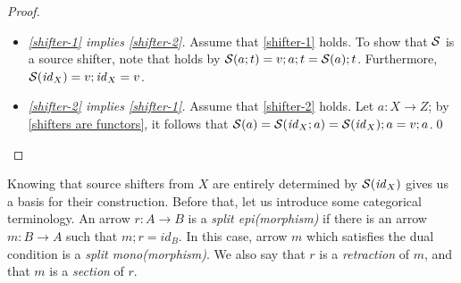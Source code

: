 \begin{fullorname}
\begin{proof}
\begin{itemize}[topsep=\smallskipamount]
\item \emph{\ref{shifter-1} implies \ref{shifter-2}.}
%
Assume that \ref{shifter-1} holds. To show that  $\mathcal{S}$ is a source shifter, note that   holds by $\mathcal{S}(a;t)=v;a;t=\mathcal{S}(a);t$. Furthermore, $\mathcal{S}(\mathit{id}_X)=v;\mathit{id}_X=v$.

\item \emph{\ref{shifter-2} implies \ref{shifter-1}.}
%
Assume that \ref{shifter-2} holds. Let $a:X\to Z$; by \eqref{shifters are functors}, it follows that $\mathcal{S}(a)=\mathcal{S}(\mathit{id}_X;a)=\mathcal{S}(\mathit{id}_X);a=v;a$.\qed
\end{itemize}
\end{proof}
\end{fullorname}
%
Knowing that source shifters from $X$ are entirely determined by $\mathcal{S}(\mathit{id}_X)$ gives us a basis for their construction. Before that, let us introduce some categorical terminology. An arrow $r: A \to B$ is a \emph{split epi(morphism)} if there is an arrow $m:B\to A$ such that $m;r = id_B$. In this case, arrow $m$ which satisfies the dual condition is a 
\emph{split mono(morphism)}. We also say that $r$ is a \emph{retraction} of $m$, and that $m$ is a \emph{section} of $r$.

